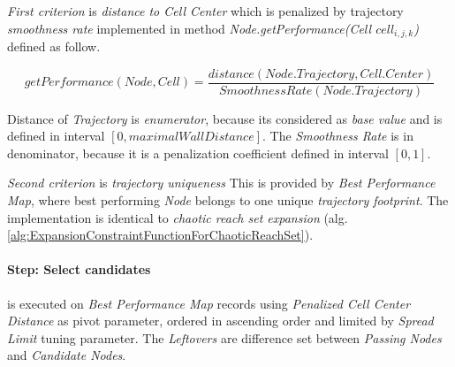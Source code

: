 \emph{First criterion} is \emph{distance to Cell Center} which is penalized by trajectory \emph{smoothness rate} implemented in method \emph{Node.getPerformance(Cell $cell_{i,j,k}$)} defined as follow.

\begin{equation}
    getPerformance(Node,Cell) = \frac{distance(Node.Trajectory,Cell.Center)}{SmoothnessRate(Node.Trajectory)}
\end{equation}

\noindent Distance of \emph{Trajectory} is \emph{enumerator}, because its considered as \emph{base value} and is defined in interval $[0,maximalWallDistance]$. The \emph{Smoothness Rate} is in denominator, because it is a penalization coefficient defined in interval $[0,1]$. 

\emph{Second criterion} is \emph{trajectory uniqueness} This is provided by \emph{Best Performance Map}, where best performing \emph{Node} belongs to one unique \emph{trajectory footprint}. The implementation is identical to \emph{chaotic reach set expansion} (alg. \ref{alg:ExpansionConstraintFunctionForChaoticReachSet}).

\paragraph{Step: Select candidates} is executed  on \emph{Best Performance Map} records using \emph{Penalized Cell Center Distance} as pivot parameter, ordered in ascending order and limited by \emph{Spread Limit} tuning parameter. The \emph{Leftovers} are difference set between \emph{Passing Nodes} and \emph{Candidate Nodes}.

